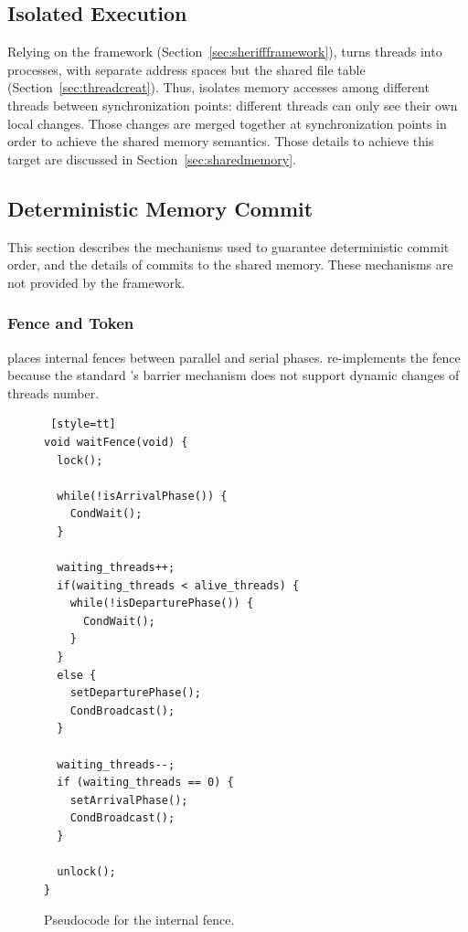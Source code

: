 \subsection{Isolated Execution}
\label{sec:threadsasprocs}

Relying on the \sheriff{} framework (Section~\ref{sec:sheriffframework}), \dthreads{} turns threads into processes, with separate address spaces but the shared file table (Section~\ref{sec:threadcreat}). Thus, \dthreads{} isolates memory accesses among different threads between synchronization points: different threads can only see their own local changes. Those changes are merged together at synchronization points in order to achieve the shared memory semantics. Those details to achieve this target are discussed in Section~\ref{sec:sharedmemory}.  

\subsection{Deterministic Memory Commit}
\label{sec:sharedmem}

This section describes the mechanisms used to guarantee deterministic commit order, and the details of commits to the shared memory. These mechanisms are not provided by the \sheriff{} framework.   

\subsubsection{Fence and Token}
\label{sec:schedule}

\dthreads{} places internal fences between parallel and serial phases. \dthreads{} re-implements the fence because the standard \pthreads{}'s barrier mechanism does not support dynamic changes of threads number. 

\begin{figure}
\begin{lstlisting} [style=tt]
void waitFence(void) {
  lock();
	
  while(!isArrivalPhase()) { 
    CondWait();
  }

  waiting_threads++;
  if(waiting_threads < alive_threads) {
    while(!isDeparturePhase()) {
      CondWait();
    }
  } 
  else {
    setDeparturePhase();
    CondBroadcast();
  }

  waiting_threads--;
  if (waiting_threads == 0) {
    setArrivalPhase();
    CondBroadcast();
  }

  unlock();
}

\end{lstlisting}
\caption{Pseudocode for the internal fence.\label{fig:internalFence}}
\end{figure}

